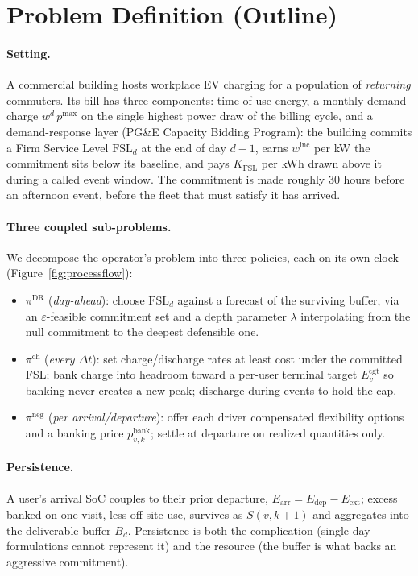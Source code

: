 \documentclass[letterpaper]{article}
\newcommand{\dt}{\Delta t}                   %
\newcommand{\Earr}{E_{\mathrm{arr}}}
\newcommand{\Edep}{E_{\mathrm{dep}}}
\newcommand{\pmax}{p^{\max}}
\newcommand{\pidr}{\pi^{\mathrm{DR}}}
\newcommand{\pich}{\pi^{\mathrm{ch}}}
\newcommand{\pineg}{\pi^{\mathrm{neg}}}
\newcommand{\Eext}{E_{\mathrm{ext}}}        %
\newcommand{\survived}[2]{S(#1,#2)}          %
\newcommand{\buff}[1]{B_{#1}}                %
\newcommand{\wdr}{w^{d}}                      %
\newcommand{\FSL}{\mathrm{FSL}}
\newcommand{\winc}{w^{\mathrm{inc}}}            %
\newcommand{\Kfsl}{K_{\mathrm{FSL}}}
\newcommand{\pbank}[2]{p^{\mathrm{bank}}_{#1,#2}}  %
\newcommand{\etarget}[1]{E^{\mathrm{tgt}}_{#1}}     %
\begin{document}
\section{Problem Definition (Outline)}\label{sec:formulation}

\paragraph{Setting.} A commercial building hosts workplace EV charging for
a population of \emph{returning} commuters. Its bill has three components:
time-of-use energy, a monthly demand charge $\wdr{}\,\pmax$ on the single
highest power draw of the billing cycle, and a demand-response layer
(PG\&E Capacity Bidding Program): the building commits a Firm Service
Level $\FSL_d$ at the end of day $d{-}1$, earns $\winc$ per kW the
commitment sits below its baseline, and pays $\Kfsl$ per kWh drawn above
it during a called event window. The commitment is made roughly 30 hours
before an afternoon event, before the fleet that must satisfy it has
arrived.

\paragraph{Three coupled sub-problems.} We decompose the operator's
problem into three policies, each on its own clock
(Figure~\ref{fig:processflow}):
\begin{itemize}
\item $\pidr$ (\emph{day-ahead}): choose $\FSL_d$ against a forecast of
the surviving buffer, via an $\varepsilon$-feasible commitment set and a
depth parameter $\lambda$ interpolating from the null commitment to the
deepest defensible one.
\item $\pich$ (\emph{every $\dt$}): set charge/discharge rates at least
cost under the committed FSL; bank charge into headroom toward a
per-user terminal target $\etarget{v}$ so banking never creates a new
peak; discharge during events to hold the cap.
\item $\pineg$ (\emph{per arrival/departure}): offer each driver
compensated flexibility options and a banking price $\pbank{v}{k}$;
settle at departure on realized quantities only.
\end{itemize}



\paragraph{Persistence.} A user's arrival SoC couples to their prior
departure, $\Earr = \Edep - \Eext$; excess banked on one visit, less
off-site use, survives as $\survived{v}{k+1}$ and aggregates into the
deliverable buffer $\buff{d}$. Persistence is both the complication
(single-day formulations cannot represent it) and the resource (the
buffer is what backs an aggressive commitment).
\end{document}
